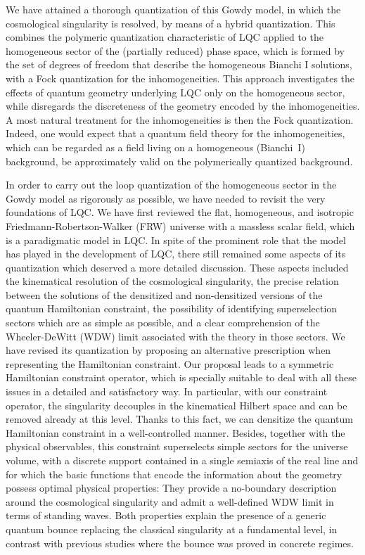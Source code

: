 We have attained a thorough quantization of this Gowdy model, in which the cosmological singularity
is resolved, by means of a hybrid quantization. This combines the polymeric quantization
characteristic of LQC applied to the homogeneous sector of the (partially reduced) phase space,
which is formed by the set of degrees of freedom that describe the homogeneous Bianchi I
solutions, with a Fock quantization for the inhomogeneities. This approach investigates the effects
of quantum geometry underlying LQC only on the homogeneous sector, while disregards the discreteness
of the geometry encoded by the inhomogeneities. A most natural treatment for the inhomogeneities is
then the Fock quantization. Indeed, one would expect that a quantum field theory for the
inhomogeneities, which can be regarded as a field living on a homogeneous (Bianchi~I) background, be
approximately valid on the polymerically quantized background. 

In order to carry out the loop quantization of the homogeneous sector in the Gowdy model as
rigorously
as possible, we have needed to revisit the very foundations of LQC. We have first reviewed the flat,
homogeneous, and isotropic Friedmann-Robertson-Walker (FRW) universe with a massless scalar field,
which is
a paradigmatic model in LQC. In spite of the prominent role that the model has played in the
development of LQC, there still remained some aspects of its quantization which deserved a more
detailed discussion. These aspects included the kinematical resolution of the cosmological
singularity, the precise relation between the solutions of the densitized and non-densitized
versions of the quantum Hamiltonian constraint, the possibility of identifying superselection
sectors which are as simple as possible, and a clear comprehension of the Wheeler-DeWitt (WDW) limit
associated with
the theory in those sectors. We have revised its quantization by proposing an alternative
prescription when representing the Hamiltonian constraint. Our proposal leads to a
symmetric Hamiltonian constraint operator, which is specially suitable to deal
with all these issues in a detailed and satisfactory way. In particular, with our constraint
operator, the singularity decouples in the kinematical Hilbert space and can be removed already at
this level. Thanks to this fact, we can densitize the quantum Hamiltonian constraint in a
well-controlled manner. Besides, together with the physical observables, this constraint
superselects simple sectors for the universe volume, with a discrete support contained in a single
semiaxis of the real line and for which the basic functions that encode the information about the
geometry possess optimal physical properties: They provide a no-boundary description around
the cosmological singularity and admit a well-defined WDW limit in terms of standing waves.
Both properties explain the presence of a generic quantum bounce replacing the classical singularity
at a fundamental level, in contrast with previous studies where the bounce was proved in concrete
regimes.

